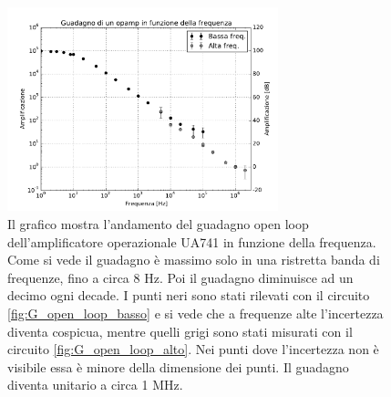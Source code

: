 \begin{figure}
    \includegraphics[width=0.7\textwidth]{Figure/A_vs_freq.pdf}
    \caption{Il grafico mostra l'andamento del guadagno open loop dell'amplificatore operazionale UA741 in funzione della frequenza. Come si vede il guadagno è massimo solo in una ristretta banda di frequenze, fino a circa 8 Hz. Poi il guadagno diminuisce ad un decimo ogni decade. I punti neri sono stati rilevati con il circuito \ref{fig:G_open_loop_basso} e si vede che a frequenze alte l'incertezza diventa cospicua, mentre quelli grigi sono stati misurati con il circuito \ref{fig:G_open_loop_alto}. Nei punti dove l'incertezza non è visibile essa è minore della dimensione dei punti. Il guadagno diventa unitario a circa 1 MHz.}
    \label{fig:G_openloop_plot1}
\end{figure}